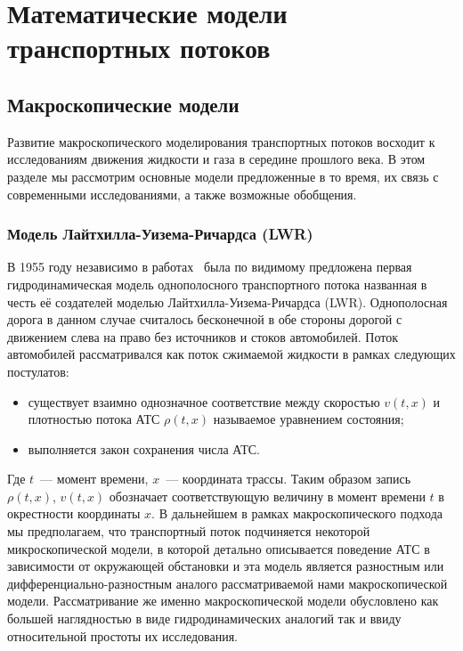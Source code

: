\chapter{Математические модели транспортных потоков}\label{ch:ch1}

\section{Макроскопические модели}\label{sec:ch1/sec1}
Развитие макроскопического моделирования транспортных потоков восходит к исследованиям движения жидкости и газа в середине прошлого века.
В этом разделе мы рассмотрим основные модели предложенные в то время, их связь с современными исследованиями, а также возможные обобщения.

\subsection{Модель Лайтхилла-Уизема-Ричардса (LWR)}\label{subsec:ch1/sec1/sub1}
В 1955 году независимо в работах~\cite{LWR/lighthill1955kinematic,richards1956shock} была по видимому предложена первая гидродинамическая модель однополосного транспортного потока названная в честь её создателей моделью Лайтхилла-Уизема-Ричардса (LWR).
Однополосная дорога в данном случае считалось бесконечной в обе стороны дорогой с движением слева на право без источников и стоков автомобилей.
Поток автомобилей рассматривался как поток сжимаемой жидкости в рамках следующих постулатов:
\begin{itemize}
  \item существует взаимно однозначное соответствие между скоростью \(v(t, x)\) и плотностью потока АТС \(\rho(t, x)\) называемое уравнением состояния;
  \item выполняется закон сохранения числа АТС.
\end{itemize}
Где \(t\)~--- момент времени, \(x\)~--- координата трассы.
Таким образом запись \(\rho(t, x)\), \(v(t, x)\) обозначает соответствующую величину в момент времени \(t\) в окрестности координаты \(x\).
В дальнейшем в рамках макроскопического подхода мы предполагаем, что транспортный поток подчиняется некоторой микроскопической модели, в которой детально описывается поведение АТС в зависимости от окружающей обстановки и эта модель является разностным или дифференциально-разностным аналого рассматриваемой нами макроскопической модели.
Рассматривание же именно макроскопической модели обусловлено как большей наглядностью в виде гидродинамических аналогий так и ввиду относительной простоты их исследования.

